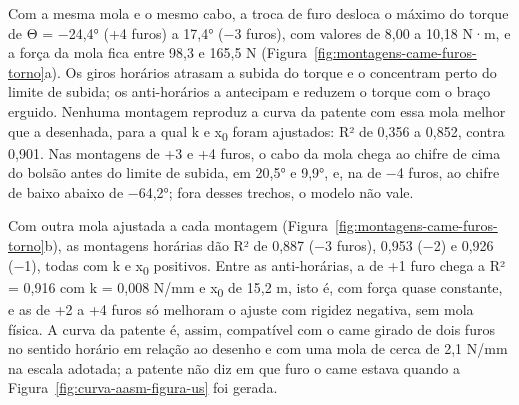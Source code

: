 Com a mesma mola e o mesmo cabo, a troca de furo desloca o máximo do torque de Θ = −24,4° (+4 furos) a 17,4° (−3 furos), com valores de 8,00 a 10,18 N·m, e a força da mola fica entre 98,3 e 165,5 N (Figura~\ref{fig:montagens-came-furos-torno}a). Os giros horários atrasam a subida do torque e o concentram perto do limite de subida; os anti-horários a antecipam e reduzem o torque com o braço erguido. Nenhuma montagem reproduz a curva da patente com essa mola melhor que a desenhada, para a qual k e x\textsubscript{0} foram ajustados: R² de 0,356 a 0,852, contra 0,901. Nas montagens de +3 e +4 furos, o cabo da mola chega ao chifre de cima do bolsão antes do limite de subida, em 20,5° e 9,9°, e, na de −4 furos, ao chifre de baixo abaixo de −64,2°; fora desses trechos, o modelo não vale.

Com outra mola ajustada a cada montagem (Figura~\ref{fig:montagens-came-furos-torno}b), as montagens horárias dão R² de 0,887 (−3 furos), 0,953 (−2) e 0,926 (−1), todas com k e x\textsubscript{0} positivos. Entre as anti-horárias, a de +1 furo chega a R² = 0,916 com k = 0,008 N/mm e x\textsubscript{0} de 15,2 m, isto é, com força quase constante, e as de +2 a +4 furos só melhoram o ajuste com rigidez negativa, sem mola física. A curva da patente é, assim, compatível com o came girado de dois furos no sentido horário em relação ao desenho e com uma mola de cerca de 2,1 N/mm na escala adotada; a patente não diz em que furo o came estava quando a Figura~\ref{fig:curva-aasm-figura-us} foi gerada.

